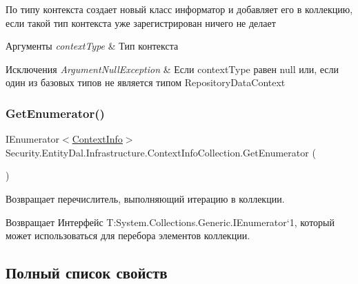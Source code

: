 По типу контекста создает новый класс информатор и добавляет его в коллекцию, если такой тип контекста уже зарегистрирован ничего не делает 


\begin{DoxyParams}{Аргументы}
{\em context\+Type} & Тип контекста\\
\hline
\end{DoxyParams}

\begin{DoxyExceptions}{Исключения}
{\em Argument\+Null\+Exception} & Если context\+Type равен null или, если один из базовых типов не является типом Repository\+Data\+Context\\
\hline
\end{DoxyExceptions}
\mbox{\label{class_security_1_1_entity_dal_1_1_infrastructure_1_1_context_info_collection_a0122f69ad29d73953b2ddcff3009c59d}} 
\subsubsection{\texorpdfstring{Get\+Enumerator()}{GetEnumerator()}}
{\footnotesize\ttfamily I\+Enumerator$<$\hyperlink{class_security_1_1_entity_dal_1_1_infrastructure_1_1_context_info}{Context\+Info}$>$ Security.\+Entity\+Dal.\+Infrastructure.\+Context\+Info\+Collection.\+Get\+Enumerator (\begin{DoxyParamCaption}{ }\end{DoxyParamCaption})}



Возвращает перечислитель, выполняющий итерацию в коллекции. 

\begin{DoxyReturn}{Возвращает}
Интерфейс T\+:\+System.\+Collections.\+Generic.\+I\+Enumerator`1, который может использоваться для перебора элементов коллекции. 
\end{DoxyReturn}


\subsection{Полный список свойств}
\mbox{\label{class_security_1_1_entity_dal_1_1_infrastructure_1_1_context_info_collection_af147ecc564c120bef48919a2dfa0b093}} 
